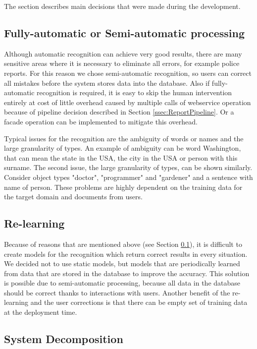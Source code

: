 
The section describes main decisions that were made during the development. 

\subsection{Fully-automatic or Semi-automatic processing}
\label{ssec:processing}

Although automatic recognition can achieve very good results, there are many
sensitive areas where it is necessary to eliminate all errors, for example
police reports. For this reason we chose semi-automatic recognition, so users
can correct all mistakes before the system stores data into the database. 
Also if fully-automatic recognition is required, it is easy
to skip the human intervention entirely at cost of little overhead caused by
multiple calls of webservice operation because of pipeline decision described in
Section \ref{ssec:ReportPipeline}. Or a facade operation can be implemented to
mitigate this overhead.

Typical issues for the recognition are the ambiguity of words or names and the
large granularity of types. An example of ambiguity can be word Washington, that
can mean the state in the USA, the city in the USA or person with this surname.
The second issue, the large granularity of types, can be shown similarly.
Consider object types "doctor", "programmer" and "gardener" and a sentence with
name of person. These problems are highly dependent on the training data for the
target domain and documents from users.

\subsection{Re-learning}

Because of reasons that are mentioned above (see Section \ref{ssec:processing}),
it is difficult to create models for the recognition which return correct
results in every situation. We decided not to use static models, but models that
are periodically learned from data that are stored in the database to improve
the accuracy. This solution is possible due to semi-automatic processing,
because all data in the database should be correct thanks to interactions with
users. Another benefit of the re-learning and the user corrections is that there
can be empty set of training data at the deployment time.

\subsection{System Decomposition}

